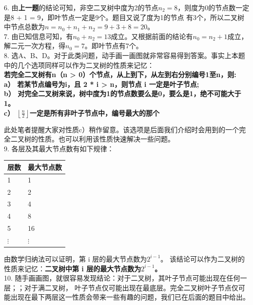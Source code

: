 \begin{exerciseanswer}
6. 由{\color{red}\textbf{上一题}}的结论可知，非空二叉树中度为2的节点\(n_2 = 8\)，则度为0的节点数一定是8 + 1 = 9，即叶节点一定是9个。题目又说了度为1的节点
有3个，所以二叉树中节点总数为\(n = n_0 + n_1 + n_2 = 9 + 3 + 8 = 20\)。\\

7. 由已知信息可知，有\(n_0 + n_2 = 13\)成立。又根据前面的结论有\(n_0 = n_2 + 1\)成立，解二元一次方程，得\(n_0 = 7\)。即叶节点有7个。\\

8. 选A、B、D。对于此类问题，动手画一画图就非常容易得到答案。事实上本题中的几个选项同样可以作为二叉树的性质来记忆：\\
\textbf{若完全二叉树有n（n > 0）个节点，从上到下，从左到右分别编号1至n，则:\\
a） 若某节点编号为i，且 2 * i > n，则节点 i 一定是叶子节点;\\
b） 对完全二叉树来说，树中度为1的节点数要么是0，要么是1，绝不可能大于1。\\
c） $\left\lfloor \frac{n}{2} \right\rfloor $一定是所有非叶子节点中，编号最大的那个\\}

此处笔者提醒大家对性质c）稍作留意。该选项是后面我们介绍时会用到的一个完全二叉树的性质。也可以利用该性质快速解决一些问题。\\

9. 各层及其最大节点数有如下规律：\\
\begin{center}
    \begin{tabular}{|l|l|}
        \hline
        层数 & 最大节点数 \\
        \hline
        1 & 1 \\
        \hline
        2 & 2 \\
        \hline
        3 & 4 \\
        \hline
        4 & 8 \\
        \hline
        5 & 16 \\
        \hline
        $\vdots$ & $\vdots$ \\
        \hline
    \end{tabular}
\end{center}

由数学归纳法可以证明，第 i 层的最大节点数为\(2^{i-1}\)。 该结论可以作为二叉树的性质来记忆：\textbf{二叉树中第 i 层的最大节点数为\(2^{i-1}\)。}\\

10. 随手画画图，就很容易发现结论：对于二叉树，其叶子节点可能出现在任何一层；；对于满二叉树，
叶子节点仅可能出现在最底层。完全二叉树叶子节点仅可能出现在最下两层这一性质会带来一些有趣的问题，我们已在后面的题目中给出。\\


\end{exerciseanswer}
